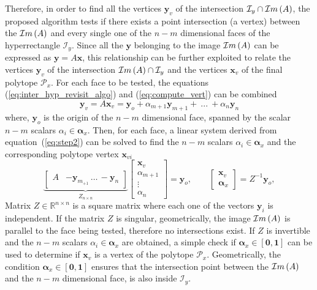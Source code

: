 Therefore, in order to find all the vertices $\bm{y}_{v}$ of the intersection $\mathcal{I}_y\cap\mathcal{I}m\left(A\right)$, the proposed algorithm tests if there exists a point intersection (a vertex) between the $\mathcal{I}m\left(A\right)$ and every single one of the $n-m$ dimensional faces of the hyperrectangle $\mathcal{I}_y$. Since all the $\bm{y}$ belonging to the image $\mathcal{I}m\left(A\right)$ can be expressed as $\bm{y}=A\bm{x}$, this relationship can be further exploited to relate the vertices $\bm{y}_{v}$ of the intersection $\mathcal{I}m\left(A\right)\cap\mathcal{I}_y$ and the vertices $\bm{x}_{v}$ of the final polytope $\mathcal{P}_x$. For each face to be tested, the equations  (\ref{eq:inter_hyp_revisit_algo}) and (\ref{eq:compute_vert}) can be combined
\begin{equation}
    \bm{y}_{v} = A \bm{x}_{v} = \bm{y}_{o} + \alpha_{m+1} \bm{y}_{m+1}+ ~...~ + \alpha_n \bm{y}_n \label{eq:step2}
\end{equation}
where, $\bm{y}_o$ is the origin of the $n\!-\!m$ dimensional face, spanned by the scalar $n\!-\!m$ scalars $\alpha_i\in\bm{\alpha}_x$.
Then, for each face, a linear system derived from equation~(\ref{eq:step2}) can be solved to find the $n\!-\!m$ scalars $\alpha_i\in\bm{\alpha}_{x}$ and the corresponding polytope vertex $\bm{x}_{vi}$
\begin{equation}
    \underbrace{\begin{bmatrix}A&-\bm{y}_{m}_{+1} \, \dots \, -\bm{y}_{n} \end{bmatrix}}_{Z_{n\times n}} \begin{bmatrix}\bm{x}_{v}\\ \alpha_{m+1} \\ \vdots\\\alpha_{n} \end{bmatrix} = \bm{y}_o, \qquad \begin{bmatrix}\bm{x}_{v}\\ \bm{\alpha}_{x} \end{bmatrix} = Z^{-1}\bm{y}_o, 
    \label{eq:linear_system_full}
\end{equation}
Matrix $Z\in\mathbb{R}^{n\times n}$ is a square matrix where each one of the vectors $\bm{y}_i$ is independent. If the matrix $Z$ is singular, geometrically, the image $\mathcal{I}m\left(A\right)$ is parallel to the face being tested, therefore no intersections exist. If $Z$ is invertible and the $n-m$ scalars $\alpha_i\in\bm{\alpha}_x$ are obtained, a simple check if $\bm{\alpha}_x \in [\bm{0},\bm{1}]$ can be used to determine if $\bm{x}_{v}$ is a vertex of the polytope $\mathcal{P}_x$. Geometrically, the condition $\bm{\alpha}_x \in [\bm{0},\bm{1}]$ ensures that the intersection point between the $\mathcal{I}m\left(A\right)$ and the $n\!-\!m$ dimensional face, is also inside $\mathcal{I}_y$.

